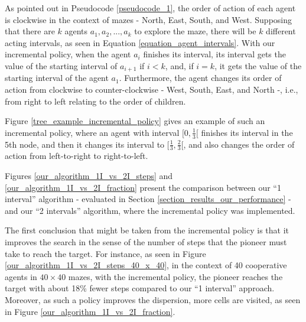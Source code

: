 As pointed out in Pseudocode \ref{pseudocode_1}, the order of action of each agent is clockwise in the context of mazes - North, East, South, and West. Supposing that there are $k$ agents $a_{1}, a_{2},...,a_{k}$ to explore the maze, there will be $k$ different acting intervals, as seen in Equation \ref{equation_agent_intervals}. With our incremental policy, when the agent $a_{i}$ finishes its interval, its interval gets the value of the starting interval of $a_{i+1}$ if $i < k$, and, if $i = k$, it gets the value of the starting interval of the agent $a_{1}$. Furthermore, the agent changes its order of action from clockwise to counter-clockwise - West, South, East, and North -, i.e., from right to left relating to the order of children.

Figure \ref{tree_example_incremental_policy} gives an example of such an incremental policy, where an agent with interval $[0, \frac{1}{3}[$ finishes its interval in the 5th node, and then it changes its interval to $[\frac{1}{3}, \frac{2}{3}[$, and also changes the order of action from left-to-right to right-to-left.

Figures \ref{our_algorithm_1I_vs_2I_steps} and \ref{our_algorithm_1I_vs_2I_fraction} present the comparison between our ``1 interval'' algorithm - evaluated in Section \ref{section_results_our_performance} - and our ``2 intervals'' algorithm, where the incremental policy was implemented.

The first conclusion that might be taken from the incremental policy is that it improves the search in the sense of the number of steps that the pioneer must take to reach the target. For instance, as seen in Figure \ref{our_algorithm_1I_vs_2I_steps_40_x_40}, in the context of 40 cooperative agents in $40 \times 40$ mazes, with the incremental policy, the pioneer reaches the target with about 18\% fewer steps compared to our ``1 interval'' approach. Moreover, as such a policy improves the dispersion, more cells are visited, as seen in Figure \ref{our_algorithm_1I_vs_2I_fraction}.

